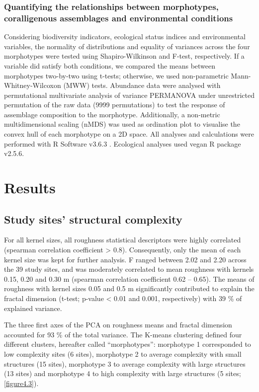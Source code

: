 \subsubsection{Quantifying the relationships between morphotypes, coralligenous assemblages and environmental conditions }\label{chapitre4_2.5.2}
Considering biodiversity indicators, ecological status indices and environmental variables, the normality of distributions and equality of variances across the four morphotypes were tested using Shapiro-Wilkinson and F-test, respectively. If a variable did satisfy both conditions, we compared the means between morphotypes two-by-two using t-tests; otherwise, we used non-parametric Mann-Whitney-Wilcoxon (MWW) tests. Abundance data were analysed with permutational multivariate analysis of variance PERMANOVA \citep{anderson_new_2001} under unrestricted permutation of the raw data (9999 permutations) to test the response of assemblage composition to the morphotype. Additionally, a non-metric multidimensional scaling (nMDS) \citep{clarke_primer_2006} was used as ordination plot to visualise the convex hull of each morphotype on a 2D space. All analyses and calculations were performed with R Software v3.6.3 \citep{r_core_team_r_2020}. Ecological analyses used vegan R package v2.5.6.

\section{Results}\label{chapitre4_3}

\subsection{Study sites’ structural complexity}\label{chapitre4_3.1}
For all kernel sizes, all roughness statistical descriptors were highly correlated (spearman correlation coefficient > 0.8). Consequently, only the mean of each kernel size was kept for further analysis. F ranged between 2.02 and 2.20 across the 39 study sites, and was moderately correlated to mean roughness with kernels 0.15, 0.20 and 0.30 m (spearman correlation coefficient 0.62 – 0.65). The means of roughness with kernel sizes 0.05 and 0.5 m significantly contributed to explain the fractal dimension (t-test; p-value < 0.01 and 0.001, respectively) with 39 \% of explained variance.

The three first axes of the PCA on roughness means and fractal dimension accounted for 93 \% of the total variance. The K-means clustering defined four different clusters, hereafter called “morphotypes”: morphotype 1 corresponded to low complexity sites (6 sites), morphotype 2 to average complexity with small structures (15 sites), morphotype 3 to average complexity with large structures (13 sites) and morphotype 4 to high complexity with large structures (5 sites; \autoref{figure4.3}).

